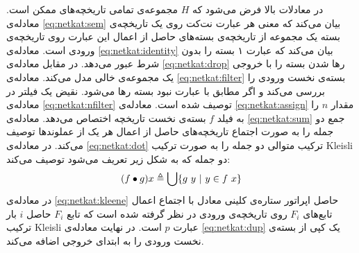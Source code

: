 در معادلات بالا فرض می‌شود که
$H$
مجموعه‌ی تمامی تاریخچه‌های ممکن است.
معادله‌ی
\ref{eq:netkat:sem}
بیان می‌کند که معنی هر عبارت نت‌کت روی یک تاریخچه‌ی بسته یک مجموعه از
تاریخچه‌ی بسته‌های حاصل از اعمال این عبارت روی تاریخچه‌ی ورودی است.
معادله‌ی
\ref{eq:netkat:identity}
بیان می‌کند که عبارت ۱ بسته را بدون شرط عبور می‌دهد.
در مقابل معادله‌ی
\ref{eq:netkat:drop}
رها شدن بسته را با خروجی یک مجموعه‌ی خالی مدل می‌کند.
معادله‌ی
\ref{eq:netkat:filter}
بسته‌ی نخست ورودی را بررسی می‌کند و اگر مطابق با عبارت نبود بسته رها می‌شود.
نقیض یک فیلتر در معادله‌ی
\ref{eq:netkat:nfilter}
توصیف شده است.
معادله‌ی
\ref{eq:netkat:assign}
مقدار
$n$
را به فیلد
$f$
بسته‌ی نخست تاریخچه اختصاص می‌دهد.
معادله‌ی
\ref{eq:netkat:sum}
جمع دو جمله را به صورت اجتماع تاریخچه‌های حاصل از اعمال هر یک از عملوند‌ها توصیف می‌کند.
در معادله‌ی
\ref{eq:netkat:dot}
ترکیب متوالی دو جمله را به صورت ترکیب
Kleisli
دو جمله که به شکل زیر تعریف می‌شود توصیف می‌کند:
\begin{align*}
    (f \bullet g) x \triangleq \bigcup \{g\ y ~|~ y \in f\ x\}
\end{align*}
در معادله‌ی
\ref{eq:netkat:kleene}
حاصل اپراتور ستاره‌ی کلینی%
معادل با اجتماع اعمال تابع‌های
$F_i$
روی تاریخچه‌ی ورودی در نظر گرفته شده است که تابع
$F_i$
حاصل
$i$
بار
ترکیب
Kleisli
عبارت
$p$
است.
در نهایت معادله‌ی
\ref{eq:netkat:dup}
یک کپی از بسته‌ی نخست ورودی را به ابتدای خروجی اضافه می‌کند.

